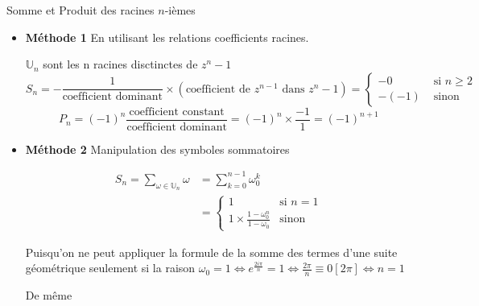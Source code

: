 \documentclass{article}
\renewenvironment{question_kholle}[2][ ]
{
	\subsection{\texorpdfstring{#2}{}}
	\notblank{#1}
	{
		\noindent #1
		\bigbreak
	}
	{}
	\begin{proof}
}
{
	\end{proof}
}
\begin{document}
\begin{question_kholle}{Somme et Produit des racines $n$-ièmes}
	\begin{itemize}[label=$\lozenge$]
		\item \textbf{Méthode 1} En utilisant les relations coefficients racines.

		      $\mathbb{U}_{n}$ sont les n racines disctinctes de $z^{n}-1$
		      $$S_{n} = - \frac{1}{\text{coefficient dominant}}\times(\text{coefficient de }z^{n-1} \text{ dans }z^{n}-1)= \left\{ \begin{array}{ll}
				      -0    & \text{ si }  n\geqslant 2 \\
				      -(-1) & \text{ sinon}
			      \end{array}\right.$$
		      $$
			      P_{n} = (-1)^{n} \frac{\text{coefficient constant}}{\text{coefficient dominant}} = (-1) ^{n}\times \frac{-1}{1} = (-1)^{n+1}
		      $$

		\item \textbf{Méthode 2} Manipulation des symboles sommatoires

		      \begin{align*}
			      S_{n} = \sum_{\omega \in \mathbb{U}_{n}}\omega & = \sum_{k=0}^{n-1}\omega_{0}^{k}                                                                    \\
			                                                     & = \left\{ \begin{array}{ll}
				                                                                 1                                                & \text{si }  n =1 \\
				                                                                 1 \times \frac{1 - \omega_{0}^{n}}{1-\omega_{0}} & \text{sinon}
			                                                                 \end{array}\right.
		      \end{align*}

		      Puisqu'on ne peut appliquer la formule de la somme des termes d'une suite géométrique seulement si la raison $\omega_{0} = 1 \iff e^{\frac{2i\pi}{n}} = 1 \iff \frac{2\pi}{n} \equiv 0 [2\pi] \iff n = 1$

		      De même


\end{itemize}
\end{question_kholle}
\end{document}
